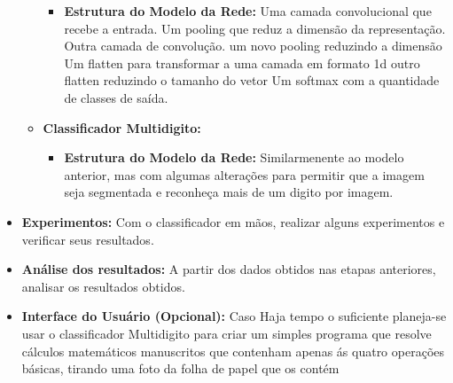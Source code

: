 \documentclass[conference]{IEEEtran}
\begin{document}
\begin{itemize}
\begin{itemize}
        \begin{itemize}       
        \item \textbf{Estrutura do Modelo da Rede:} Uma camada convolucional que recebe a entrada.
        Um pooling que reduz a dimensão da representação.
        Outra camada de convolução.
        um novo pooling reduzindo a dimensão
        Um flatten para transformar a uma camada em formato 1d
        outro flatten reduzindo o tamanho do vetor
        Um softmax com a quantidade de classes de saída.
        \end{itemize}
        
        \item \textbf{Classificador Multidigito:} 
        
        \begin{itemize}       
        \item \textbf{Estrutura do Modelo da Rede:} Similarmenente ao modelo anterior, mas com algumas alterações para permitir que a imagem seja segmentada e reconheça mais de um digito por imagem.
        \end{itemize}
        
    \end{itemize}
    

    
\item \textbf{Experimentos:}
Com o classificador em mãos, realizar alguns experimentos e verificar seus resultados.
\item \textbf{Análise dos resultados:}
A partir dos dados obtidos nas etapas anteriores, analisar os resultados obtidos.

\item \textbf{Interface do Usuário (Opcional): } 
    Caso Haja tempo o suficiente planeja-se usar o classificador Multidigito para criar um simples programa que resolve cálculos matemáticos manuscritos que contenham apenas ás quatro operações básicas, tirando uma foto da folha de papel que os contém
\end{itemize}
\end{document}
